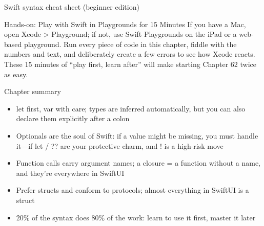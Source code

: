 \begin{center}\small\color{gray}Swift syntax cheat sheet (beginner edition)\end{center}

\begin{tcbpractice}{Hands-on: Play with Swift in Playgrounds for 15 Minutes}
If you have a Mac, open Xcode > Playground; if not, use Swift Playgrounds on the iPad or a web-based playground. Run every piece of code in this chapter, fiddle with the numbers and text, and deliberately create a few errors to see how Xcode reacts. These 15 minutes of “play first, learn after” will make starting Chapter 62 twice as easy.

\end{tcbpractice}

\begin{tcbsummary}{Chapter summary}
\begin{itemize}
  \item let first, var with care; types are inferred automatically, but you can also declare them explicitly after a colon
  \item Optionals are the soul of Swift: if a value might be missing, you must handle it—if let / ?? are your protective charm, and ! is a high-risk move
  \item Function calls carry argument names; a closure = a function without a name, and they're everywhere in SwiftUI
  \item Prefer structs and conform to protocols; almost everything in SwiftUI is a struct
  \item 20\% of the syntax does 80\% of the work: learn to use it first, master it later
\end{itemize}

\end{tcbsummary}
